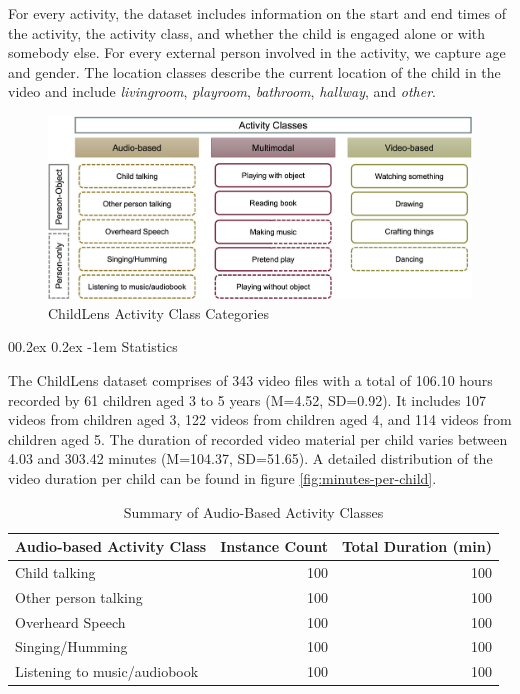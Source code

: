 \documentclass[
  man,floatsintext]{apa6}
\makeatletter
\let\oldparagraph\paragraph
\renewcommand{\paragraph}{
    \@ifstar
      \xxxParagraphStar
      \xxxParagraphNoStar
  }
\newcommand{\xxxParagraphStar}[1]{\oldparagraph*{#1}\mbox{}}
\newcommand{\xxxParagraphNoStar}[1]{\oldparagraph{#1}\mbox{}}
\renewcommand{\paragraph}{\@startsection{paragraph}{4}{\parindent}%
  {0\baselineskip \@plus 0.2ex \@minus 0.2ex}%
  {-1em}%
  {\normalfont\normalsize\bfseries\itshape\typesectitle}}
\makeatother
\begin{document}
For every activity, the dataset includes information on the start and end times of the activity, the activity class, and whether the child is engaged alone or with somebody else. For every external person involved in the activity, we capture age and gender. The location classes describe the current location of the child in the video and include \emph{livingroom}, \emph{playroom}, \emph{bathroom}, \emph{hallway}, and \emph{other}.

\begin{figure}

{\centering \includegraphics[width=5.95in]{images/ChildLens_activity_classes} 

}

\caption{ChildLens Activity Class Categories}\label{fig:activity-classes}
\end{figure}

\paragraph{Statistics}\label{statistics}

The ChildLens dataset comprises of 343 video files with a total of 106.10 hours recorded by 61 children aged 3 to 5 years (M=4.52, SD=0.92). It includes 107 videos from children aged 3, 122 videos from children aged 4, and 114 videos from children aged 5. The duration of recorded video material per child varies between 4.03 and 303.42 minutes (M=104.37, SD=51.65). A detailed distribution of the video duration per child can be found in figure \ref{fig:minutes-per-child}.

\begin{longtable}[t]{lrr}
\caption{\label{tab:audio-classes-statistics}\label{tab:audio-classes-statistics}Summary of Audio-Based Activity Classes}\\
\toprule
\textbf{Audio-based Activity Class} & \textbf{Instance Count} & \textbf{Total Duration (min)}\\
\midrule
Child talking & 100 & 100\\
Other person talking & 100 & 100\\
Overheard Speech & 100 & 100\\
Singing/Humming & 100 & 100\\
Listening to music/audiobook & 100 & 100\\
\bottomrule
\end{longtable}
\end{document}
